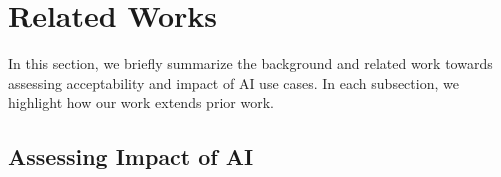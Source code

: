 \section{Related Works}
\label{sec:related-works}


In this section, we briefly summarize the background and related work towards assessing acceptability and impact of AI use cases. In each subsection, we highlight how our work extends prior work.

\subsection{Assessing Impact of AI}


